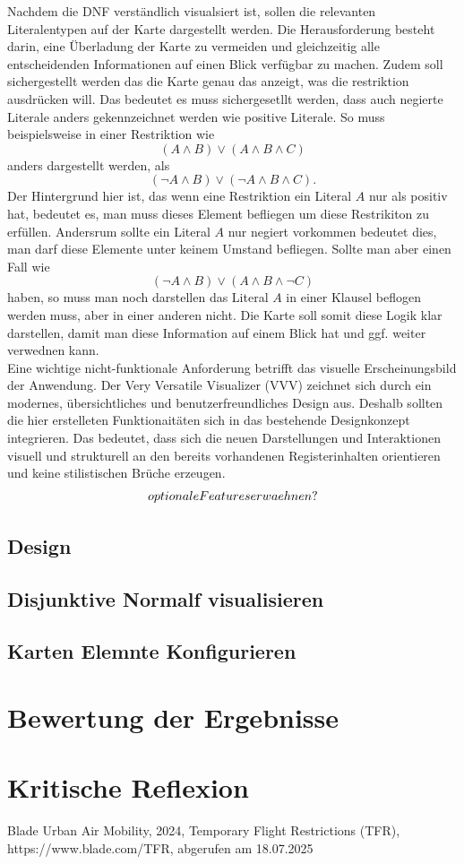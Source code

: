 \documentclass[a4paper,12pt]{article}
\begin{document}
Nachdem die DNF verständlich visualsiert ist, sollen die relevanten  Literalentypen auf der Karte dargestellt werden. Die Herausforderung besteht darin, eine Überladung der Karte zu vermeiden und gleichzeitig alle entscheidenden Informationen auf einen Blick verfügbar zu machen. Zudem soll sichergestellt werden das die Karte genau das anzeigt, was die restriktion ausdrücken will. Das bedeutet es muss sichergesetllt werden, dass auch negierte Literale anders gekennzeichnet werden wie positive Literale. So muss beispielsweise in einer Restriktion wie \[( A \land B) \lor (A \land B \land C)\] anders dargestellt werden, als \[( \neg A \land B) \lor (\neg A \land B \land C).\] Der Hintergrund hier ist, das wenn eine Restriktion ein Literal \(A\) nur als positiv hat, bedeutet es, man muss dieses Element befliegen um diese Restrikiton zu erfüllen. Andersrum sollte ein Literal \(A\) nur negiert vorkommen bedeutet dies, man darf diese Elemente unter keinem Umstand befliegen. Sollte man aber einen Fall wie \[(\neg A \land B) \lor (A \land B \land \neg C)\] haben, so muss man noch darstellen das Literal \(A\) in einer Klausel beflogen werden muss, aber in einer anderen nicht. Die Karte soll somit diese Logik klar darstellen, damit man diese Information auf einem Blick hat und ggf. weiter verwednen kann. \\
Eine wichtige nicht-funktionale Anforderung betrifft das visuelle Erscheinungsbild der Anwendung. Der Very Versatile Visualizer (VVV) zeichnet sich durch ein modernes, übersichtliches und benutzerfreundliches Design aus. Deshalb sollten die hier erstelleten Funktionaitäten sich in das bestehende Designkonzept integrieren. Das bedeutet, dass sich die neuen Darstellungen und Interaktionen visuell und strukturell an den bereits vorhandenen Registerinhalten orientieren und keine stilistischen Brüche erzeugen.
\[optionale\space Features\space erwaehnen ?\]
\subsection{Design}
\subsection{Disjunktive Normalf visualisieren}
\subsection{Karten Elemnte Konfigurieren}
\newpage
\section{Bewertung der Ergebnisse}
\newpage
\section{Kritische Reflexion}


\newpage
{}
\begin{thebibliography}{9}  %
Blade Urban Air Mobility, 2024, Temporary Flight Restrictions (TFR), https://www.blade.com/TFR, abgerufen am 18.07.2025


\end{thebibliography}
\end{document}
